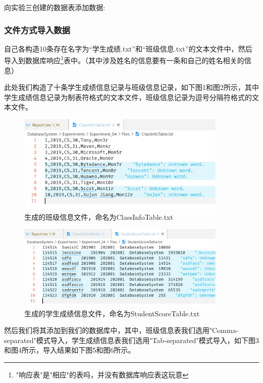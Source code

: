 \documentclass[a4paper,UTF8,heading=false,12pt]{article}
\begin{document}
向实验三创建的数据表添加数据:

\subsubsection{文件方式导入数据}

自己各构造10条存在名字为“学生成绩.txt”和“班级信息.txt”的文本文件中，然后导入到数据库响应\footnote{"响应表"是"相应"的表吗，并没有数据库响应表这玩意}表中。（其中涉及姓名的信息要有一条和自己的姓名相关的信息）

\newpage

此处我们构造了十条学生成绩信息记录与班级信息记录，如下图1和图2所示，其中学生成绩信息记录为制表符格式的文本文件，班级信息记录为逗号分隔符格式的文本文件。

\begin{figure}[htbp]
    \centering
    \includegraphics[width=10cm]{../Images/ClassInfoTable.png}
    \caption{生成的班级信息文件，命名为ClassInfoTable.txt}
\end{figure}

\begin{figure}[htbp]
    \centering
    \includegraphics[width=10cm]{../Images/StudentScoreTable.png}
    \caption{生成的学生成绩信息文件，命名为StudentScoreTable.txt}
\end{figure}

\newpage

然后我们将其添加到我们的数据库中，其中，班级信息表我们选用"Comma-separated"模式导入，学生成绩信息表我们选用"Tab-separated"模式导入，如下图3和图4所示，导入结果如下图5和图6所示。
\end{document}
